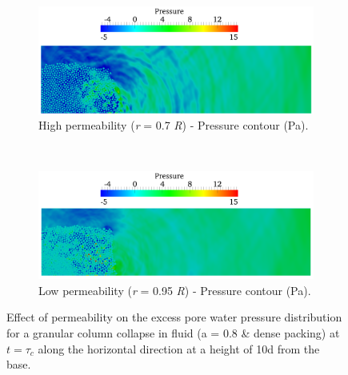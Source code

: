 \documentclass[12pt,a4paper,twocolumn,fleqn]{narms}
\begin{document}
\begin{figure}
\ContinuedFloat
\begin{subfigure}[t]{0.975\linewidth}
	\centering
    \includegraphics[width=\linewidth]{figs/a08/r07_PWP_ini_press_dense}
    \caption{High permeability (\textit{r} = 0.7 \textit{R}) - Pressure contour 
    (Pa).}
    \label{fig:r07_PWPress_ini_dense}
\end{subfigure} \\
\begin{subfigure}[t]{0.975\linewidth}
	\centering
    \includegraphics[width=\linewidth]{figs/a08/r095_PWP_ini_press_dense}
    \caption{Low permeability (\textit{r} = 0.95 \textit{R}) - Pressure contour 
    (Pa).}
    \label{fig:r095_PWPress_ini_dense}
\end{subfigure}

\caption{Effect of permeability on the excess pore water pressure distribution 
for a granular column collapse in fluid (a = 0.8 \& dense packing) at $t = 
\tau_c$ along the horizontal direction at a height of 10d from the base.}
\label{fig:PWP_ini_dense}
\end{figure}
\end{document}
